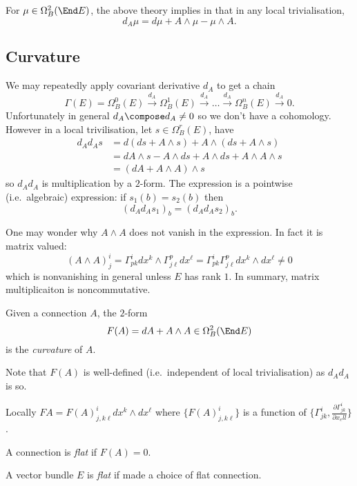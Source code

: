 \documentclass[a4paper]{article}
\newcommand{\w}{\wedge}
\begin{document}
\begin{eg}
  For \(\mu \in \Omega_B^2(\End E)\), the above theory implies in that in any local trivialisation,
  \[
    d_A\mu = d\mu + A \w \mu - \mu \w A.
  \]
\end{eg}

\subsection{Curvature}

We may repeatedly apply covariant derivative \(d_A\) to get a chain
\[
  \Gamma(E) = \Omega_B^0(E) \xrightarrow{d_A} \Omega_B^1(E) \xrightarrow{d_A} \dots \xrightarrow{d_A} \Omega_B^n(E) \xrightarrow{d_A} 0.
\]
Unfortunately in general \(d_A \compose d_A \neq 0\) so we don't have a cohomology. However in a local trivilisation, let \(s \in \Omega_B^r(E)\), have
\begin{align*}
  d_A d_As
  &= d(ds + A \w s) + A \w (ds + A \w s) \\
  &= dA \w s - A \w ds + A \w ds + A \w A \w s \\
  &= (d A + A \w A) \w s
\end{align*}
so \(d_Ad_A\) is multiplication by a \(2\)-form. The expression is a pointwise (i.e.\ algebraic) expression: if \(s_1(b) = s_2(b)\) then
\[
  (d_A d_A s_1)_b = (d_A d_A s_2)_b.
\]

\begin{note}
  One may wonder why \(A \w A\) does not vanish in the expression. In fact it is matrix valued:
  \[
    (A \w A)_j^i
    = \Gamma_{pk}^i dx^k \w \Gamma_{j\ell}^p dx^\ell
    = \Gamma_{pk}^i \Gamma_{j\ell}^p dx^k \w dx^\ell
    \neq 0
  \]
  which is nonvanishing in general unless \(E\) has rank \(1\). In summary, matrix multiplicaiton is noncommutative.
\end{note}

\begin{definition}[curvature]
  Given a connection \(A\), the \(2\)-form
  \[
    F(A) = dA + A \w A \in \Omega_B^2(\End E)
  \]
  is the \emph{curvature} of \(A\).
\end{definition}

Note that \(F(A)\) is well-defined (i.e.\ independent of local trivialisation) as \(d_Ad_A\) is so.

Locally \(FA = F(A)_{j, k\ell}^i dx^k \w dx^\ell\) where \(\{F(A)_{j, k\ell}^i\}\) is a function of \(\{\Gamma_{jk}^i, \frac{\partial \Gamma_{jk}^i}{\partial x_ell}\}\).

\begin{definition}[flat]
  A connection is \emph{flat} if \(F(A) = 0\).

  A vector bundle \(E\) is \emph{flat} if made a choice of flat connection.
\end{definition}
\end{document}
